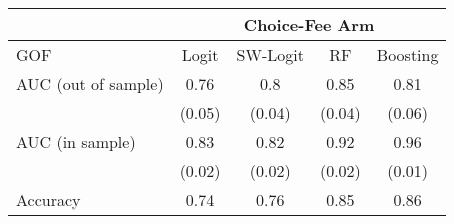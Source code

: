 \begin{tabular}{lcccc}
\toprule
      & \multicolumn{4}{c}{Choice-Fee Arm} \\
\midrule
\midrule
GOF & Logit & SW-Logit & RF    & Boosting \\
\midrule
\midrule
AUC (out of sample) & 0.76  & 0.8   & 0.85  & 0.81 \\
      & (0.05) & (0.04) & (0.04) & (0.06) \\
AUC (in sample) & 0.83  & 0.82  & 0.92  & 0.96 \\
      & (0.02) & (0.02) & (0.02) & (0.01) \\
Accuracy & 0.74  & 0.76  & 0.85  & 0.86 \\
\bottomrule
\bottomrule
\end{tabular}%
